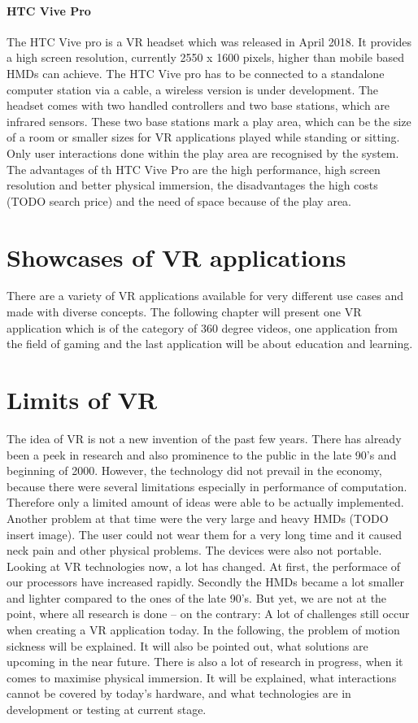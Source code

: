 \paragraph{HTC Vive Pro}
The HTC Vive pro is a VR headset which was released in April 2018. It provides a high screen resolution, currently 2550 x 1600 pixels, higher than mobile based HMDs can achieve. The HTC Vive pro has to be connected to a standalone computer station via a cable, a wireless version is under development. The headset comes with two handled controllers and two base stations, which are infrared sensors. 
These two base stations mark a play area, which can be the size of a room or smaller sizes for VR applications played while standing or sitting. Only user interactions done within the play area are recognised by the system. \cite{Ogdon.2019}
The advantages of th HTC Vive Pro are the high performance, high screen resolution and better physical immersion, the disadvantages the high costs (TODO search price) and the need of space because of the play area.

\section{Showcases of VR applications}
There are a variety of VR applications available for very different use cases and made with diverse concepts. The following chapter will present one VR application which is of the category of 360 degree videos, one application from the field of gaming and the last application will be about education and learning.
\section{Limits of VR}
The idea of VR is not a new invention of the past few years. There has already been a peek in research and also prominence to the public in the late 90's and beginning of 2000. However, the technology did not prevail in the economy, because there were several limitations especially in performance of computation. Therefore only a limited amount of ideas were able to be actually implemented. Another problem at that time were the very large and heavy HMDs (TODO insert image). The user could not wear them for a very long time and it caused neck pain and other physical problems. The devices were also not portable. \cite{Jerald.2016}\\
Looking at VR technologies now, a lot has changed. At first, the performace of our processors have increased rapidly. Secondly the HMDs became a lot smaller and lighter compared to the ones of the late 90's. But yet, we are not at the point, where all research is done -- on the contrary: A lot of challenges still occur when creating a VR application today. In the following, the problem of motion sickness will be explained. It will also be pointed out, what solutions are upcoming in the near future. There is also a lot of research in progress, when it comes to maximise physical immersion. It will be explained, what interactions cannot be covered by today's hardware, and what technologies are in development or testing at current stage.
